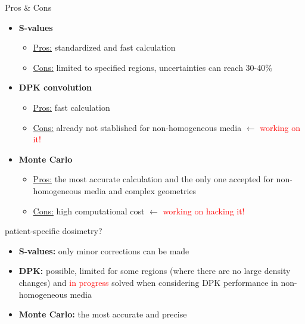 \documentclass[ignorenonframetext,]{beamer}
\providecommand{\tightlist}{%
  \setlength{\itemsep}{0pt}\setlength{\parskip}{0pt}}
\begin{document}
\begin{frame}{Pros \& Cons}
\protect\hypertarget{pros-cons}{}

\begin{itemize}
\tightlist
\item
  \textbf{S-values}

  \begin{itemize}
  \tightlist
  \item
    \underline{Pros:} standardized and fast calculation
  \item
    \underline{Cons:} limited to specified regions, uncertainties can
    reach 30-40\%
  \end{itemize}
\item
  \textbf{DPK convolution}

  \begin{itemize}
  \tightlist
  \item
    \underline{Pros:} fast calculation
  \item
    \underline{Cons:} already not stablished for non-homogeneous media
    \(\leftarrow\) \textcolor{red}{working on it!}
  \end{itemize}
\item
  \textbf{Monte Carlo}

  \begin{itemize}
  \tightlist
  \item
    \underline{Pros:} the most accurate calculation and the only one
    accepted for non-homogeneous media and complex geometries
  \item
    \underline{Cons:} high computational cost \(\leftarrow\)
    \textcolor{red}{working on hacking it!}
  \end{itemize}
\end{itemize}

\end{frame}

\begin{frame}{patient-specific dosimetry?}
\protect\hypertarget{patient-specific-dosimetry}{}

\begin{itemize}
\item
  \textbf{S-values:} only minor corrections can be made
\item
  \textbf{DPK:} possible, limited for some regions (where there are no
  large density changes) and \textcolor{red}{in progress} solved when
  considering DPK performance in non-homogeneous media
\item
  \textbf{Monte Carlo:} the most accurate and precise
\end{itemize}

\end{frame}
\end{document}
